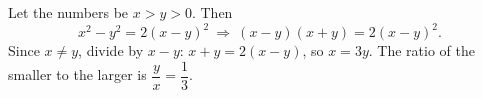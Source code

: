 Let the numbers be $x>y>0$. Then
\[
x^2-y^2=2(x-y)^2\ \Longrightarrow\ (x-y)(x+y)=2(x-y)^2 .
\]
Since $x\ne y$, divide by $x-y$: $x+y=2(x-y)$, so $x=3y$. The ratio of the smaller to the larger is $\dfrac {y}{x}=\boxed{\dfrac{1}{3}}$.
